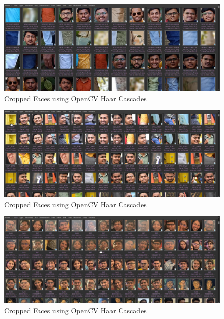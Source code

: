 \documentclass[openany]{report}
\begin{document}
\begin{figure}[H]
    \centering
    \includegraphics[width=.95\textwidth]{../imgs/Cropped images.png}
    \caption{Cropped Faces using OpenCV Haar Cascades}
\end{figure}

\begin{figure}[H]
    \centering
    \includegraphics[width=.95\textwidth]{../imgs/Copped images 2.png}
    \caption{Cropped Faces using OpenCV Haar Cascades}
\end{figure}

\begin{figure}[H]
    \centering
    \includegraphics[width=.95\textwidth]{../imgs/Copped images 3.png}
    \caption{Cropped Faces using OpenCV Haar Cascades}
\end{figure}
\end{document}

